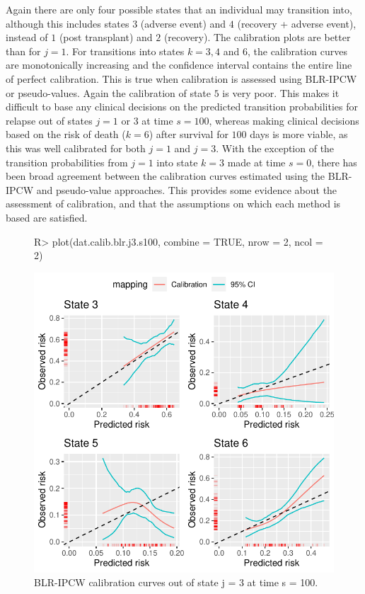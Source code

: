 \documentclass[article,shortnames]{jss}
\begin{document}
Again there are only four possible states that an individual may transition into, although this includes states $3$ (adverse event) and $4$ (recovery + adverse event), instead of $1$ (post transplant) and $2$ (recovery). The calibration plots are better than for $j = 1$. For transitions into states $k = 3, 4$ and $6$, the calibration curves are monotonically increasing and the confidence interval contains the entire line of perfect calibration. This is true when calibration is assessed using BLR-IPCW or pseudo-values. Again the calibration of state $5$ is very poor. This makes it difficult to base any clinical decisions on the predicted transition probabilities for relapse out of states $j = 1$ or $3$ at time $s = 100$, whereas making clinical decisions based on the risk of death ($k = 6$) after survival for $100$ days is more viable, as this was well calibrated for both $j = 1$ and $j = 3$. With the exception of the transition probabilities from $j = 1$ into state $k = 3$ made at time $s = 0$, there has been broad agreement between the calibration curves estimated using the BLR-IPCW and pseudo-value approaches. This provides some evidence about the assessment of calibration, and that the assumptions on which each method is based are satisfied.

\begin{figure}
\centering
\begin{Schunk}
\begin{Sinput}
R> plot(dat.calib.blr.j3.s100, combine = TRUE, nrow = 2, ncol = 2)
\end{Sinput}
\end{Schunk}
\includegraphics{calibmsm-jss-20230613-015}
\caption{\label{fig:blrj3s100} BLR-IPCW calibration curves out of state j =  3 at time s = 100.}
\end{figure}
\end{document}
